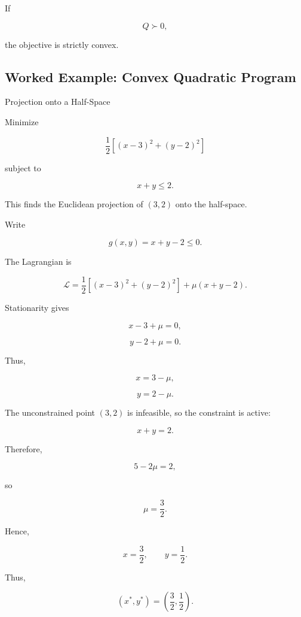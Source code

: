 If

\[
Q\succ0,
\]

the objective is strictly convex.

\subsection{Worked Example: Convex Quadratic Program}
\label{subsec:worked-convex-qp}

\begin{workedexamplebox}{Projection onto a Half-Space}

Minimize

\[
\frac12
\left[
(x-3)^2
+
(y-2)^2
\right]
\]

subject to

\[
x+y\leq2.
\]

This finds the Euclidean projection of \((3,2)\) onto the half-space.

Write

\[
g(x,y)=x+y-2\leq0.
\]

The Lagrangian is

\[
\mathcal{L}
=
\frac12
\left[
(x-3)^2+(y-2)^2
\right]
+
\mu(x+y-2).
\]

Stationarity gives

\[
x-3+\mu=0,
\]

\[
y-2+\mu=0.
\]

Thus,

\[
x=3-\mu,
\]

\[
y=2-\mu.
\]

The unconstrained point \((3,2)\) is infeasible, so the constraint is
active:

\[
x+y=2.
\]

Therefore,

\[
5-2\mu=2,
\]

so

\[
\mu=\frac32.
\]

Hence,

\[
x=\frac32,
\qquad
y=\frac12.
\]

Thus,

\begin{answerbox}
\[
\boxed{
(x^*,y^*)
=
\left(
\frac32,
\frac12
\right).
}
\]
\end{answerbox}

\end{workedexamplebox}

